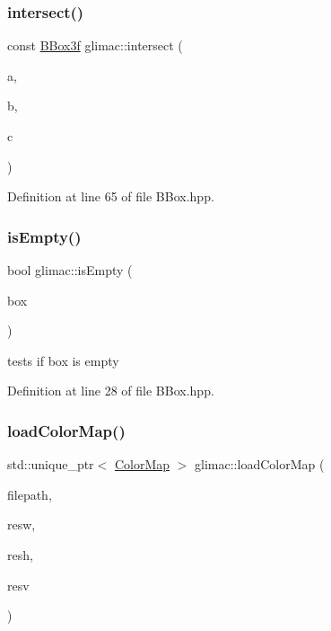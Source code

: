 \subsubsection{\texorpdfstring{intersect()}{intersect()}\hspace{0.1cm}{\footnotesize\ttfamily [2/2]}}
{\footnotesize\ttfamily const \hyperlink{structglimac_1_1_b_box3f}{B\+Box3f} glimac\+::intersect (\begin{DoxyParamCaption}\item[{const \hyperlink{structglimac_1_1_b_box3f}{B\+Box3f} \&}]{a,  }\item[{const \hyperlink{structglimac_1_1_b_box3f}{B\+Box3f} \&}]{b,  }\item[{const \hyperlink{structglimac_1_1_b_box3f}{B\+Box3f} \&}]{c }\end{DoxyParamCaption})\hspace{0.3cm}{\ttfamily [inline]}}



Definition at line 65 of file B\+Box.\+hpp.

\mbox{\label{namespaceglimac_af7b3a92359ef55ad38fb46b78d8f56f5}} 
\subsubsection{\texorpdfstring{is\+Empty()}{isEmpty()}}
{\footnotesize\ttfamily bool glimac\+::is\+Empty (\begin{DoxyParamCaption}\item[{const \hyperlink{structglimac_1_1_b_box3f}{B\+Box3f} \&}]{box }\end{DoxyParamCaption})\hspace{0.3cm}{\ttfamily [inline]}}

tests if box is empty 

Definition at line 28 of file B\+Box.\+hpp.

\mbox{\label{namespaceglimac_a2dda30e8ea4df5f5177717f7c8a134c4}} 
\subsubsection{\texorpdfstring{load\+Color\+Map()}{loadColorMap()}}
{\footnotesize\ttfamily std\+::unique\+\_\+ptr$<$ \hyperlink{classglimac_1_1_color_map}{Color\+Map} $>$ glimac\+::load\+Color\+Map (\begin{DoxyParamCaption}\item[{const \hyperlink{classglimac_1_1_file_path}{File\+Path} \&}]{filepath,  }\item[{float}]{resw,  }\item[{float}]{resh,  }\item[{float}]{resv }\end{DoxyParamCaption})}

